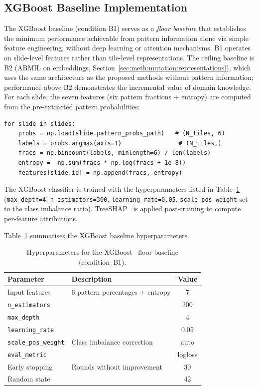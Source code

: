 \subsection{XGBoost Baseline Implementation}
\label{sec:impl:mutation:xgboost}

The XGBoost baseline (condition B1) serves as a \emph{floor baseline}
that establishes the minimum performance achievable from pattern
information alone via simple feature engineering, without deep
learning or attention mechanisms.
B1 operates on slide-level features rather than tile-level
representations.
The ceiling baseline is B2 (ABMIL on embeddings,
Section~\ref{sec:meth:mutation:representations}), which uses the
same architecture as the proposed methods without pattern
information; performance above B2 demonstrates the incremental
value of domain knowledge.
For each slide, the seven features (six pattern fractions + entropy) are computed from the pre-extracted pattern probabilities:

\begin{verbatim}
for slide in slides:
    probs = np.load(slide.pattern_probs_path)   # (N_tiles, 6)
    labels = probs.argmax(axis=1)                # (N_tiles,)
    fracs = np.bincount(labels, minlength=6) / len(labels)
    entropy = -np.sum(fracs * np.log(fracs + 1e-8))
    features[slide.id] = np.append(fracs, entropy)
\end{verbatim}

The XGBoost classifier is trained with the hyperparameters listed in Table~\ref{tab:hyper_xgboost2} (\texttt{max\_depth=4}, \texttt{n\_estimators=300}, \texttt{learning\_rate=0.05}, \texttt{scale\_pos\_weight} set to the class imbalance ratio).
TreeSHAP~\cite{lundberg2020treeshap} is applied post-training to compute per-feature attributions.

Table~\ref{tab:hyper_xgboost2} summarises the XGBoost baseline
hyperparameters.
 
\begin{table}[ht!]
\centering
\small
\caption{Hyperparameters for the XGBoost~\cite{chen2016xgboost} floor
baseline (condition~B1).}
\label{tab:hyper_xgboost2}
\begin{tabular}{l l c}
\hline
\textbf{Parameter} & \textbf{Description} & \textbf{Value} \\
\hline
Input features      & 6 pattern percentages + entropy     & 7 \\
\texttt{n\_estimators}  &                                 & 300 \\
\texttt{max\_depth}     &                                 & 4 \\
\texttt{learning\_rate} &                                 & 0.05 \\
\texttt{scale\_pos\_weight} & Class imbalance correction  & auto \\
\texttt{eval\_metric}   &                                 & logloss \\
Early stopping      & Rounds without improvement          & 30 \\
Random state        &                                     & 42 \\
\hline
\end{tabular}
\end{table}
 

